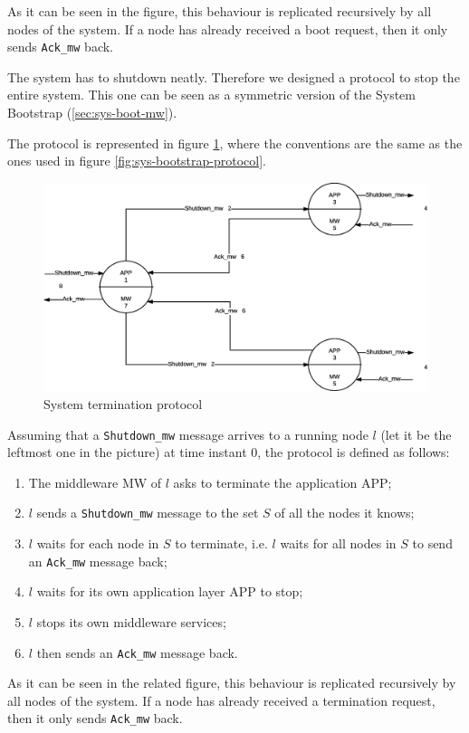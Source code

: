 As it can be seen in the figure, this behaviour is replicated recursively
by all nodes of the system. If a node has already received a boot request,
then it only sends \texttt{Ack\_mw} back.


\label{sec:comm-mw-termination}
The system has to shutdown neatly. Therefore we designed a protocol to
stop the entire system. This one can be seen as a
symmetric version of the System Bootstrap (\ref{sec:sys-boot-mw}).

The protocol is represented in figure \ref{fig:sys-termination-protocol}, where
the conventions are the same as the ones used in figure
\ref{fig:sys-bootstrap-protocol}.

\begin{figure}[H]
  \centering
  \includegraphics[width=\columnwidth]{images/solution/termination.eps}
  \caption{System termination protocol}
  \label{fig:sys-termination-protocol}
\end{figure}

Assuming that a \texttt{Shutdown\_mw} message arrives to a running node
$l$ (let it be the leftmost one in the picture) at time instant $0$, the
protocol is defined as follows:

\begin{enumerate}
\item The middleware MW of $l$ asks to terminate the application APP;
\item $l$ sends a \texttt{Shutdown\_mw} message to the set
  $S$ of all the nodes it knows;
\item $l$ waits for each node in $S$ to terminate, i.e. $l$ waits for all
  nodes in $S$ to send an \texttt{Ack\_mw} message back;
\item $l$ waits for its own application layer APP to stop;
\item $l$ stops its own middleware services;
\item $l$ then sends an \texttt{Ack\_mw} message back.
\end{enumerate}

As it can be seen in the related figure, this behaviour is replicated
recursively by all nodes of the system. If a node has already received a
termination request, then it only sends \texttt{Ack\_mw} back.
